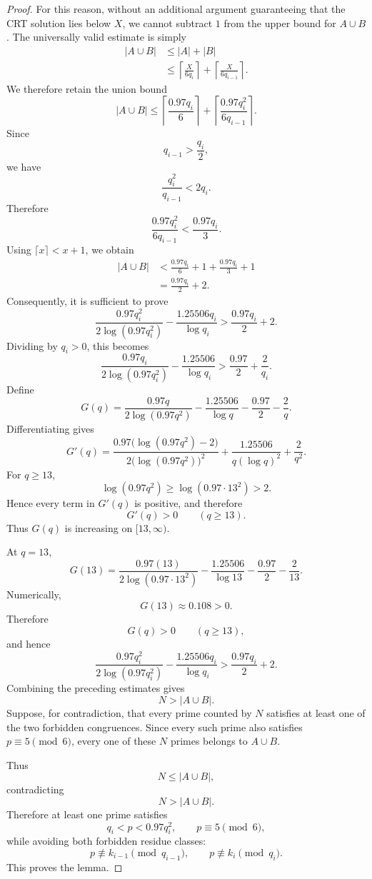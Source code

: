 \documentclass[11pt,a4paper]{article}
\theoremstyle{definition}
\theoremstyle{remark}
\begin{document}
\begin{proof}
For this reason, without an additional argument guaranteeing that the
CRT solution lies below \(X\), we cannot subtract \(1\) from the
upper bound for \(A\cup B\). The universally valid estimate is simply
\[
\begin{aligned}
|A\cup B|
&\le |A|+|B|\\
&\le
\left\lceil\frac{X}{6q_i}\right\rceil
+
\left\lceil\frac{X}{6q_{i-1}}\right\rceil.
\end{aligned}
\]
We therefore retain the union bound
\[
\boxed{
|A\cup B|
\le
\left\lceil\frac{0.97q_i}{6}\right\rceil
+
\left\lceil
\frac{0.97q_i^2}{6q_{i-1}}
\right\rceil.
}
\]
Since
\[
q_{i-1}>\frac{q_i}{2},
\]
we have
\[
\frac{q_i^2}{q_{i-1}}<2q_i.
\]
Therefore
\[
\frac{0.97q_i^2}{6q_{i-1}}
<
\frac{0.97q_i}{3}.
\]
Using \(\lceil x\rceil<x+1\), we obtain
\[
\begin{aligned}
|A\cup B|
&<
\frac{0.97q_i}{6}+1
+
\frac{0.97q_i}{3}+1\\
&=
\frac{0.97q_i}{2}+2.
\end{aligned}
\]
Consequently, it is sufficient to prove
\[
\frac{0.97q_i^2}
{2\log(0.97q_i^2)}
-\frac{1.25506q_i}{\log q_i}
>
\frac{0.97q_i}{2}+2.
\]
Dividing by \(q_i>0\), this becomes
\[
\frac{0.97q_i}
{2\log(0.97q_i^2)}
-\frac{1.25506}{\log q_i}
>
\frac{0.97}{2}+\frac2{q_i}.
\]
Define
\[
G(q)
=
\frac{0.97q}
{2\log(0.97q^2)}
-\frac{1.25506}{\log q}
-\frac{0.97}{2}
-\frac2q.
\]
Differentiating gives
\[
G'(q)
=
\frac{0.97\bigl(\log(0.97q^2)-2\bigr)}
{2\bigl(\log(0.97q^2)\bigr)^2}
+
\frac{1.25506}{q(\log q)^2}
+
\frac2{q^2}.
\]
For \(q\ge13\),
\[
\log(0.97q^2)
\ge
\log(0.97\cdot13^2)>2.
\]
Hence every term in \(G'(q)\) is positive, and therefore
\[
G'(q)>0
\qquad(q\ge13).
\]
Thus \(G(q)\) is increasing on \([13,\infty)\).

At \(q=13\),
\[
G(13)
=
\frac{0.97(13)}
{2\log(0.97\cdot13^2)}
-\frac{1.25506}{\log13}
-\frac{0.97}{2}
-\frac2{13}.
\]
Numerically,
\[
G(13)\approx0.108>0.
\]
Therefore
\[
G(q)>0
\qquad(q\ge13),
\]
and hence
\[
\frac{0.97q_i^2}
{2\log(0.97q_i^2)}
-\frac{1.25506q_i}{\log q_i}
>
\frac{0.97q_i}{2}+2.
\]
Combining the preceding estimates gives
\[
N>|A\cup B|.
\]
Suppose, for contradiction, that every prime counted by \(N\) satisfies
at least one of the two forbidden congruences. Since every such prime
also satisfies \(p\equiv5\pmod6\), every one of these \(N\) primes
belongs to \(A\cup B\).

Thus
\[
N\le |A\cup B|,
\]
contradicting
\[
N>|A\cup B|.
\]
Therefore at least one prime satisfies
\[
q_i<p<0.97q_i^2,
\qquad
p\equiv5\pmod6,
\]
while avoiding both forbidden residue classes:
\[
p\not\equiv k_{i-1}\pmod{q_{i-1}},
\qquad
p\not\equiv k_i\pmod{q_i}.
\]
This proves the lemma.
\end{proof}
\end{document}
